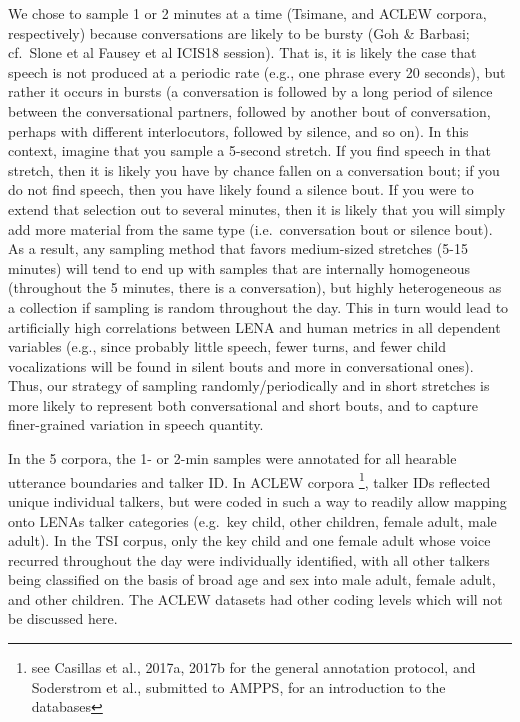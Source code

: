 \documentclass[english,floatsintext,man]{apa6}
\begin{document}
We chose to sample 1 or 2 minutes at a time (Tsimane, and ACLEW corpora,
respectively) because conversations are likely to be bursty (Goh \&
Barbasi; cf.~Slone et al Fausey et al ICIS18 session). That is, it is
likely the case that speech is not produced at a periodic rate (e.g.,
one phrase every 20 seconds), but rather it occurs in bursts (a
conversation is followed by a long period of silence between the
conversational partners, followed by another bout of conversation,
perhaps with different interlocutors, followed by silence, and so on).
In this context, imagine that you sample a 5-second stretch. If you find
speech in that stretch, then it is likely you have by chance fallen on a
conversation bout; if you do not find speech, then you have likely found
a silence bout. If you were to extend that selection out to several
minutes, then it is likely that you will simply add more material from
the same type (i.e.~conversation bout or silence bout). As a result, any
sampling method that favors medium-sized stretches (5-15 minutes) will
tend to end up with samples that are internally homogeneous (throughout
the 5 minutes, there is a conversation), but highly heterogeneous as a
collection if sampling is random throughout the day. This in turn would
lead to artificially high correlations between LENA and human metrics in
all dependent variables (e.g., since probably little speech, fewer
turns, and fewer child vocalizations will be found in silent bouts and
more in conversational ones). Thus, our strategy of sampling
randomly/periodically and in short stretches is more likely to represent
both conversational and short bouts, and to capture finer-grained
variation in speech quantity.

In the 5 corpora, the 1- or 2-min samples were annotated for all
hearable utterance boundaries and talker ID. In ACLEW corpora
\footnote{see Casillas et al., 2017a, 2017b for the general annotation protocol, and Soderstrom et al., submitted to AMPPS, for an introduction to the databases},
talker IDs reflected unique individual talkers, but were coded in such a
way to readily allow mapping onto LENAs talker categories (e.g.~key
child, other children, female adult, male adult). In the TSI corpus,
only the key child and one female adult whose voice recurred throughout
the day were individually identified, with all other talkers being
classified on the basis of broad age and sex into male adult, female
adult, and other children. The ACLEW datasets had other coding levels
which will not be discussed here.
\end{document}
